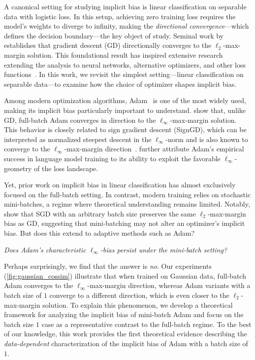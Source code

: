 \documentclass{article} %
\theoremstyle{plain}
\theoremstyle{definition}
\theoremstyle{remark}
\begin{document}
A canonical setting for studying implicit bias is linear classification on separable data with logistic loss. In this setup, achieving zero training loss requires the model’s weights to diverge to infinity, making the \emph{directional convergence}---which defines the decision boundary---the key object of study. Seminal work by \citet{soudry2018the} establishes that gradient descent (GD) directionally converges to the $\ell_2$-max-margin solution. This foundational result has inspired extensive research extending the analysis to neural networks, alternative optimizers, and other loss functions~\citep{gunasekar2018implicit,ji2018gradient,ji2020directional,lyu2020gradient,chizat2020implicit,yun2021a}. In this work, we revisit the simplest setting---linear classification on separable data---to examine how the choice of optimizer shapes implicit bias.

Among modern optimization algorithms, Adam~\citep{kingma2014adam} is one of the most widely used, making its implicit bias particularly important to understand. \citet{zhang2024the} show that, unlike GD, full-batch Adam converges in direction to the $\ell_\infty$-max-margin solution. This behavior is closely related to sign gradient descent (SignGD), which can be interpreted as normalized steepest descent in the $\ell_\infty$-norm and is also known to converge to the $\ell_\infty$-max-margin direction~\citep{gunasekar2018characterizing,fan2025implicitbiasspectraldescent}. \citet{xie2025adam} further attribute Adam's empirical success in language model training to its ability to exploit the favorable $\ell_\infty$-geometry of the loss landscape.

Yet, prior work on implicit bias in linear classification has almost exclusively focused on the full-batch setting. In contrast, modern training relies on stochastic mini-batches, a regime where theoretical understanding remains limited. Notably, \citet{nacson2019stochastic} show that SGD with an arbitrary batch size preserves the same $\ell_2$-max-margin bias as GD, suggesting that mini-batching may not alter an optimizer’s implicit bias. But does this extend to adaptive methods such as Adam? 

\begin{center}
\emph{Does Adam’s characteristic $\ell_\infty$-bias persist under the mini-batch setting?}
\end{center}

Perhaps surprisingly, we find that the answer is \emph{no}. Our experiments (\cref{fig:gaussian_cossim}) illustrate that when trained on Gaussian data, full-batch Adam converges to the $\ell_\infty$-max-margin direction, whereas Adam variants with a batch size of $1$ converge to a different direction, which is even closer to the $\ell_2$-max-margin solution. To explain this phenomenon, we develop a theoretical framework for analyzing the implicit bias of mini-batch Adam and focus on the batch size $1$ case as a representative contrast to the full-batch regime. To the best of our knowledge, this work provides the first theoretical evidence describing the \emph{data-dependent} characterization of the implicit bias of Adam with a batch size of $1$.
\end{document}

